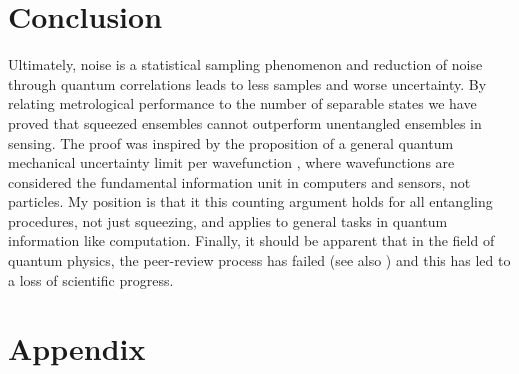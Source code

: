\documentclass[reqno]{amsart}
\begin{document}

\section*{Conclusion}
Ultimately, noise is a statistical sampling phenomenon and reduction of noise through quantum correlations leads to less samples and worse uncertainty. By relating metrological performance to the number of separable states we have proved that squeezed ensembles cannot outperform unentangled ensembles in sensing. The proof was inspired by the proposition of a general quantum mechanical uncertainty limit per wavefunction \cite{McGuinness2021a}, where wavefunctions are considered the fundamental information unit in computers and sensors, not particles. My position is that it this counting argument holds for all entangling procedures, not just squeezing, and applies to general tasks in quantum information like computation. Finally, it should be apparent that in the field of quantum physics, the peer-review process has failed (see also \cite{McGuinness2022, McGuinness2023, McGuinness2023a}) and this has led to a loss of scientific progress.


%


\section*{Appendix}
\end{document}
